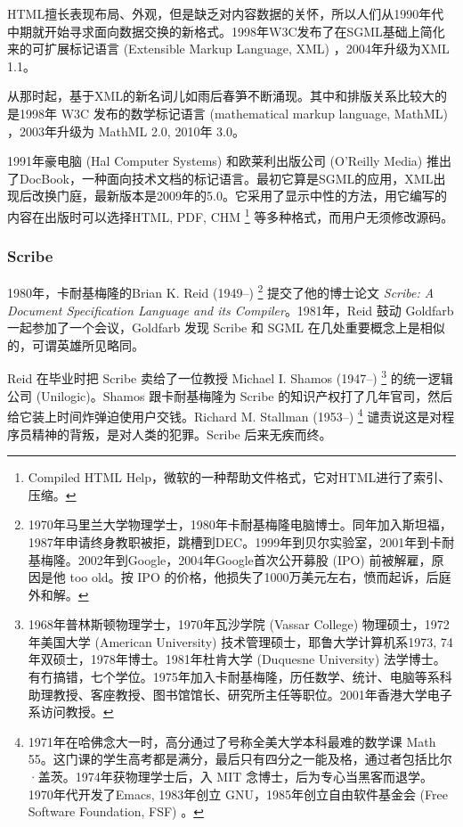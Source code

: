 HTML擅长表现布局、外观，但是缺乏对内容数据的关怀，所以人们从1990年代中期就开始寻求面向数据交换的新格式。1998年W3C发布了在SGML基础上简化来的可扩展标记语言 (Extensible Markup Language, XML) ，2004年升级为XML 1.1。

从那时起，基于XML的新名词儿如雨后春笋不断涌现。其中和排版关系比较大的是1998年 W3C 发布的数学标记语言 (mathematical markup language, MathML) ，2003年升级为 MathML 2.0, 2010年 3.0。

1991年豪电脑 (Hal Computer Systems)\indexHal{} 和欧莱利出版公司 (O'Reilly Media)\indexOreilly{} 推出了DocBook，一种面向技术文档的标记语言。最初它算是SGML的应用，XML出现后改换门庭，最新版本是2009年的5.0。它采用了显示中性的方法，用它编写的内容在出版时可以选择HTML, PDF, CHM \footnote{Compiled HTML Help，微软的一种帮助文件格式，它对HTML进行了索引、压缩。} 等多种格式，而用户无须修改源码。

\subsubsection{Scribe}

1980年，卡耐基梅隆的Brian K. Reid (1949--)\indexReid{} \footnote{1970年马里兰大学物理学士，1980年卡耐基梅隆电脑博士。同年加入斯坦福，1987年申请终身教职被拒，跳槽到DEC。1999年到贝尔实验室\indexBell{}，2001年到卡耐基梅隆。2002年到Google，2004年Google首次公开募股 (IPO) 前被解雇，原因是他 too old。按 IPO 的价格，他损失了1000万美元左右，愤而起诉，后庭外和解。} 提交了他的博士论文 \emph{Scribe: A Document Specification Language and its Compiler}。1981年，Reid 鼓动 Goldfarb 一起参加了一个会议，Goldfarb 发现 Scribe 和 SGML 在几处重要概念上是相似的，可谓英雄所见略同。

Reid 在毕业时把 Scribe 卖给了一位教授 Michael I. Shamos (1947--)\indexShamos{} \footnote{1968年普林斯顿物理学士，1970年瓦沙学院 (Vassar College) 物理硕士，1972年美国大学 (American University) 技术管理硕士，耶鲁大学计算机系1973, 74年双硕士，1978年博士。1981年杜肯大学 (Duquesne University) 法学博士。有冇搞错，七个学位。1975年加入卡耐基梅隆，历任数学、统计、电脑等系科助理教授、客座教授、图书馆馆长、研究所主任等职位。2001年香港大学电子系访问教授。} 的统一逻辑公司 (Unilogic)\indexUnilogic{}。Shamos 跟卡耐基梅隆为 Scribe 的知识产权打了几年官司，然后给它装上时间炸弹迫使用户交钱。Richard M. Stallman (1953--)\indexStallman{} \footnote{1971年在哈佛念大一时，高分通过了号称全美大学本科最难的数学课 Math 55。这门课的学生高考都是满分，最后只有四分之一能及格，通过者包括比尔·盖茨。1974年获物理学士后，入 MIT 念博士，后为专心当黑客而退学。1970年代开发了Emacs, 1983年创立 GNU，1985年创立自由软件基金会 (Free Software Foundation, FSF) 。} 谴责说这是对程序员精神的背叛，是对人类的犯罪。Scribe 后来无疾而终。


